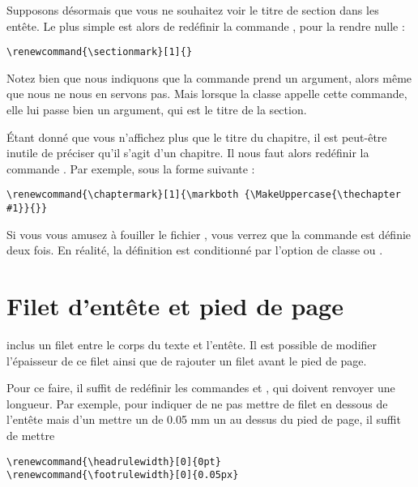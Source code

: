 Supposons désormais que vous ne souhaitez voir le titre de section dans les entête. Le plus simple est alors de redéfinir la commande , pour la rendre nulle :

\begin{verbatim}
\renewcommand{\sectionmark}[1]{}
\end{verbatim}

\begin{attention}
Notez bien que nous indiquons que la commande  prend un argument, alors même que nous ne nous en servons pas. Mais lorsque la classe  appelle cette commande, elle lui passe bien un argument, qui est le titre de la section.
\end{attention}

Étant donné que vous n'affichez plus que le titre du chapitre, il est peut-être inutile de préciser qu'il s'agit d'un chapitre. Il nous faut alors redéfinir la commande . Par exemple, sous la forme suivante :

\begin{verbatim}
\renewcommand{\chaptermark}[1]{\markboth {\MakeUppercase{\thechapter #1}}{}}
\end{verbatim}

\begin{plusloins}
Si vous vous amusez à fouiller le fichier , vous verrez que la commande  est définie deux fois. En réalité, la définition est conditionné par l'option de classe  ou .
\end{plusloins}
\section{Filet d'entête et pied de page}

 inclus un filet entre le corps du texte et l'entête. Il est possible de modifier l'épaisseur de ce filet ainsi que de rajouter un filet avant le  pied de page.

Pour ce faire, il suffit de redéfinir les commandes  et , qui doivent renvoyer une longueur.
Par exemple, pour indiquer de ne pas mettre de filet en dessous de l'entête mais d'un mettre un de 0.05 mm un au dessus du pied de page, il suffit de mettre 
\begin{verbatim}
\renewcommand{\headrulewidth}[0]{0pt}
\renewcommand{\footrulewidth}[0]{0.05px}

\end{verbatim}
